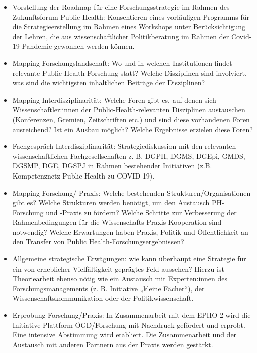 \documentclass{article}
\begin{document}
\begin{itemize}
\item Vorstellung der Roadmap für eine Forschungsstrategie im Rahmen des Zukunftsforum Public Health: Konsentieren eines vorläufigen Programms für die Strategieerstellung im Rahmen eines Workshops unter Berücksichtigung der Lehren, die aus wissenschaftlicher Politikberatung im Rahmen der Covid-19-Pandemie gewonnen werden können.


\item Mapping Forschungslandschaft: Wo und in welchen Institutionen findet relevante Public-Health-Forschung statt? Welche Disziplinen sind involviert, was sind die wichtigsten inhaltlichen Beiträge der Disziplinen?


\item Mapping Interdisziplinarität: Welche Foren gibt es, auf denen sich Wissenschaftler:innen der Public-Health-relevanten Disziplinen austauschen (Konferenzen, Gremien, Zeitschriften etc.) und sind diese vorhandenen Foren ausreichend? Ist ein Ausbau möglich? Welche Ergebnisse erzielen diese Foren?


\item Fachgespräch Interdisziplinarität: Strategiediskussion mit den relevanten wissenschaftlichen Fachgesellschaften z. B. DGPH, DGMS, DGEpi, GMDS, DGSMP, DGE, DGSPJ in Rahmen bestehender Initiativen (z.B. Kompetenznetz Public Health zu COVID-19).


\item Mapping-Forschung/-Praxis: Welche bestehenden Strukturen/Organisationen gibt es? Welche Strukturen werden benötigt, um den Austausch PH-Forschung und -Praxis zu fördern? Welche Schritte zur Verbesserung der Rahmenbedingungen für die Wissenschafts-Praxis-Kooperation sind notwendig? Welche Erwartungen haben Praxis, Politik und Öffentlichkeit an den Transfer von Public Health-Forschungsergebnissen?


\item Allgemeine strategische Erwägungen: wie kann überhaupt eine Strategie für ein von erheblicher Vielfältigkeit geprägtes Feld aussehen? Hierzu ist Theoriearbeit ebenso nötig wie ein Austausch mit Experten:innen des Forschungsmanagements (z. B. Initiative „kleine Fächer“), der Wissenschaftskommunikation oder der Politikwissenschaft.


\item Erprobung Forschung/Praxis: In Zusammenarbeit mit dem EPHO 2 wird die Initiative Plattform ÖGD/Forschung mit Nachdruck gefördert und erprobt. Eine intensive Abstimmung wird etabliert. Die Zusammenarbeit und der Austausch mit anderen Partnern aus der Praxis werden gestärkt.



\end{itemize}
\end{document}
